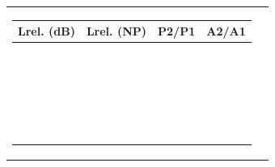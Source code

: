 \begin{tabular}{ll}
\parbox{7cm}{ 
    \scriptsize
    \renewcommand{\arraystretch}{1.2}
    \begin{tabular}{|c|c|c|c|}
    \hline
    \textbf{Lrel. (dB)} & \textbf{Lrel. (NP)} & \textbf{P2/P1} & \textbf{A2/A1} \\ \hline
    $100.000$ & $11.513$ & $10^{10}$ & $10^5$ \\ \hline
    $90.000$ & $10.362$ & $10^9$ & $31622.777$ \\ \hline
    $80.000$ & $9.210$ & $10^8$ & $10^4$ \\ \hline
    $70.000$ & $8.059$ & $10^7$ & $3162.278$ \\ \hline
    $60.000$ & $6.908$ & $10^6$ & $10^3$ \\ \hline
    $50.000$ & $5.756$ & $10^5$ & $316.228$ \\ \hline
    $40.000$ & $4.605$ & $10^4$ & $10^2$ \\ \hline
    $30.000$ & $3.454$ & $10^3$ & $31.623$ \\ \hline
    \textbf{$20.000$} & $2.303$ & \textbf{$10^2$} & \textbf{$10.000$} \\ \hline
    $19.085$ & $2.197$ & $81.000$ & $9.000$ \\ \hline
    $19.000$ & $2.187$ & $79.433$ & $8.913$ \\ \hline
    $18.062$ & $2.079$ & $64.000$ & $8.000$ \\ \hline
    $18.000$ & $2.072$ & $63.096$ & $7.943$ \\ \hline
    $17.000$ & $1.957$ & $50.119$ & $7.079$ \\ \hline
    $16.902$ & $1.946$ & $49.000$ & $7.000$ \\ \hline
    $16.000$ & $1.842$ & $39.811$ & $6.310$ \\ \hline
    $15.563$ & $1.792$ & $36.000$ & $6.000$ \\ \hline
    $15.000$ & $1.727$ & $31.623$ & $5.623$ \\ \hline
    $14.000$ & $1.612$ & $25.119$ & $5.012$ \\ \hline
    \textbf{$13.979$} & $1.609$ & \textbf{$25.000$} & \textbf{$5.000$} \\ \hline
    $13.000$ & $1.497$ & $19.953$ & $4.467$ \\ \hline
    \textbf{$12.041$} & $1.386$ & \textbf{$16.000$} & \textbf{$4.000$} \\ \hline
    \textbf{$12.000$} & $1.382$ & $15.849$ & $3.981$ \\ \hline
    $11.000$ & $1.266$ & $12.589$ & $3.548$ \\ \hline

\end{tabular}}
\end{tabular}
